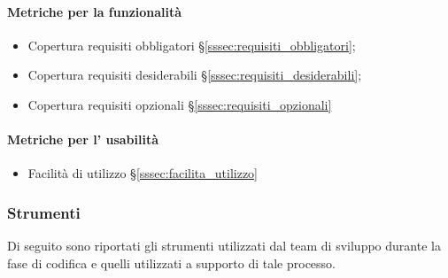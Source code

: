 \paragraph{Metriche per la funzionalità}
\begin{itemize}
    \item Copertura requisiti obbligatori §\ref{sssec:requisiti_obbligatori};
    \item Copertura requisiti desiderabili §\ref{sssec:requisiti_desiderabili};
    \item Copertura requisiti opzionali §\ref{sssec:requisiti_opzionali}
\end{itemize}
\paragraph{Metriche per l' usabilità}
\begin{itemize}
    \item Facilità di utilizzo §\ref{sssec:facilita_utilizzo}
\end{itemize}

\subsubsection{Strumenti}\label{sssec:Strumenti}
Di seguito sono riportati gli strumenti utilizzati dal team di sviluppo durante la fase di codifica e quelli utilizzati a supporto di tale processo.
